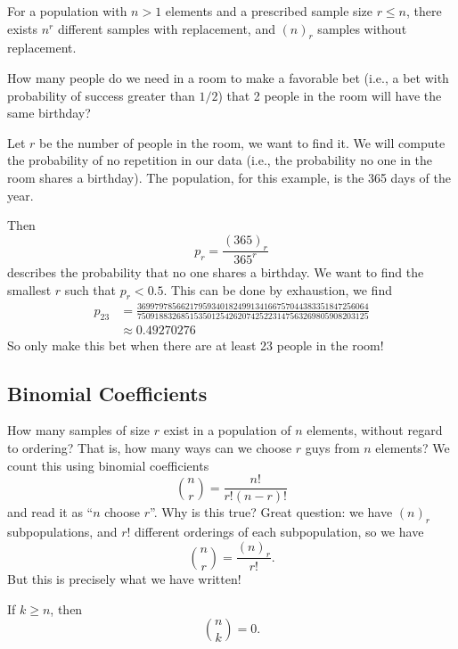 For a population with $n>1$ elements and a prescribed sample size $r\leq n$,
there exists $n^{r}$ different samples with replacement, and $(n)_{r}$
samples without replacement.

How many people do we need in a room to make a favorable bet (i.e., a
bet with probability of success greater than $1/2$) that 2 people in the
room will have the same birthday?

Let $r$ be the number of people in the room, we want to find it. We will
compute the probability of no repetition in our data (i.e., the
probability no one in the room shares a birthday). The population, for
this example, is the 365 days of the year. 

Then
\begin{equation}
p_{r} = \frac{(365)_{r}}{365^{r}}
\end{equation}
describes the probability that no one shares a birthday. We want to find
the smallest $r$ such that $p_{r}<0.5$. This can be done by exhaustion,
we find
\begin{equation}
\begin{split}
p_{23} &=
\frac{36997978566217959340182499134166757044383351847256064}{75091883268515350125426207425223147563269805908203125}\\
&\approx 0.49270276
\end{split}
\end{equation}
So only make this bet when there are at least 23 people in the room!


\subsection{Binomial Coefficients}
\M
How many samples of size $r$ exist in a population of $n$ elements,
without regard to ordering? That is, how many ways can we choose $r$
guys from $n$ elements? We count this using binomial coefficients
\begin{equation}
\binom{n}{r} = \frac{n!}{r!(n-r)!}
\end{equation}
and read it as ``$n$ choose $r$''. Why is this true? Great question: we
have $(n)_r$ subpopulations, and $r!$ different orderings of each
subpopulation, so we have
\begin{equation}
\binom{n}{r}=\frac{(n)_{r}}{r!}.
\end{equation}
But this is precisely what we have written!

If $k\geq n$, then
\begin{equation}
\binom{n}{k}=0.
\end{equation}

